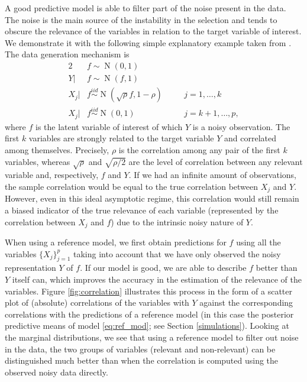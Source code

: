 \documentclass[a4]{article}
\theoremstyle{definition}
\DeclareMathOperator{\N}{N}
\begin{document}
A good predictive model is able to filter part of the noise present in
the data. The noise is the main source of the instability in the selection
and tends to
obscure the relevance of the variables in relation to the target
variable of interest. We demonstrate it with the following simple
explanatory example taken from \cite{paper:projpred}. The data
generation mechanism is
\begin{alignat}{2} \label{eq:simulated_data}
     &f\sim \N(0,1) && \nonumber \\ 
     Y|&f\sim \N(f,1) && \\
     X_{j}|&f \overset{iid}{\sim} \N(\sqrt{\rho}f,1-\rho) \quad &&j=1,\ldots,k \nonumber \\
     X_{j}|&f \overset{iid}{\sim} \N(0,1) &&j=k+1,\ldots,p \nonumber,
\end{alignat}
where $f$ is the latent variable of interest of which $Y$ is a noisy
observation. The first $k$ variables are strongly related to the
target variable $Y$ and correlated among themselves. Precisely, $\rho$
is the correlation among any pair of the first $k$ variables, whereas
$\sqrt{\rho}$ and $\sqrt{\rho/2}$ are the level of correlation between
any relevant variable and, respectively, $f$ and $Y$. If we had an
infinite amount of observations, the sample correlation would be equal
to the true correlation between $X_j$ and $Y$. However, even in this
ideal asymptotic regime, this correlation would still remain a biased
indicator of the true relevance of each variable (represented by the
correlation between $X_j$ and $f$) due to the intrinsic noisy nature
of $Y$.

When using a reference model, we first obtain predictions for $f$
using all the variables $\{X_{j}\}_{j=1}^{p}$ taking into account
that we have only observed the noisy representation $Y$ of $f$. If our
model is good, we are able to describe $f$ better than $Y$ itself can,
which improves the accuracy in the estimation of the relevance of the
variables.  Figure \ref{fig:correlation} illustrates this process in
the form of a scatter plot of (absolute) correlations of the
variables with $Y$ against the corresponding correlations with the
predictions of a reference model (in this case the posterior
predictive means of model \eqref{eq:ref_mod}; see Section
\ref{simulations}). Looking at the marginal distributions, we see
that using a reference model to filter out noise in the data, the two
groups of variables (relevant and non-relevant) can be distinguished
much better than when the correlation is computed using the observed
noisy data directly.
\end{document}
